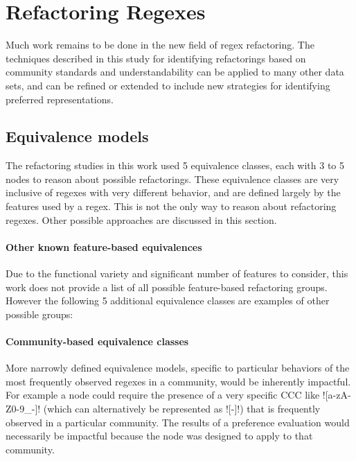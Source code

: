 \section{Refactoring Regexes}
Much work remains to be done in the new field of regex refactoring.  The techniques described in this study for identifying refactorings based on community standards and understandability can be applied to many other data sets, and can be refined or extended to include new strategies for identifying preferred representations.

\subsection{Equivalence models}
The refactoring studies in this work used 5 equivalence classes, each with 3 to 5 nodes to reason about possible refactorings.  These equivalence classes are very inclusive of regexes with very different behavior, and are defined largely by the features used by a regex.  This is not the only way to reason about refactoring regexes.  Other possible approaches are discussed in this section.

\paragraph{Other known feature-based equivalences}  Due to the functional variety and significant number of features to consider, this work does not provide a list of all possible feature-based refactoring groups.  However the following 5 additional equivalence classes are examples of other possible groups:

\paragraph{Community-based equivalence classes}  More narrowly defined equivalence models, specific to particular behaviors of the most frequently observed regexes in a community, would be inherently impactful.  For example a node could require the presence of a very specific CCC like \cverb![a-zA-Z0-9_-]! (which can alternatively be represented as \cverb![\w-]!) that is frequently observed in a particular community.  The results of a preference evaluation would necessarily be impactful because the node was designed to apply to that community.

